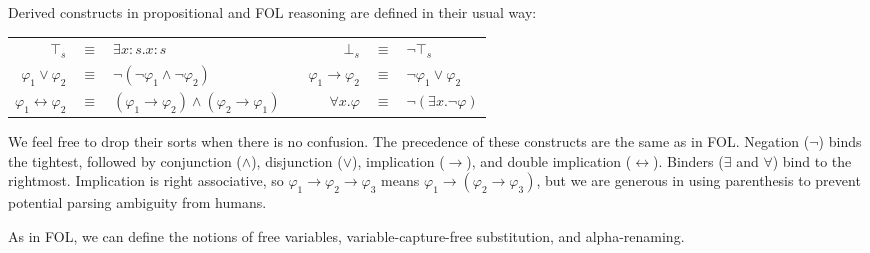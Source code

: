 \documentclass[acmsmall]{acmart}
\theoremstyle{acmdefinition}
\newcommand{\imp}{\to}
\newcommand{\dimp}{\leftrightarrow}
\newcommand{\cln}{{:}}
\begin{document}
Derived constructs in propositional and FOL reasoning
are defined in their usual way:
\begin{center}
\begin{tabular}{rclp{1cm}rcl}
$\top_s$ & $\equiv$ & $\exists x \cln s . x \cln s$
&&
$\bot_s$ & $\equiv$ & $\neg \top_s$
\\
$\varphi_1 \vee \varphi_2$ & $\equiv$ & 
$\neg (\neg \varphi_1 \wedge \neg \varphi_2)$
&&
$\varphi_1 \imp \varphi_2$ & $\equiv$ &
$\neg \varphi_1 \vee \varphi_2$
\\
$\varphi_1 \dimp \varphi_2$ & $\equiv$ &
$(\varphi_1 \imp \varphi_2) \wedge (\varphi_2 \imp \varphi_1)$
&&
$\forall x . \varphi$ & $\equiv$ &
$\neg (\exists x . \neg \varphi)$
\end{tabular}
\end{center}
We feel free to drop their sorts when there is no confusion.
The precedence of these constructs are the same as in FOL.
Negation ($\neg$) binds the tightest, followed by
conjunction ($\wedge$),
disjunction ($\vee$),
implication ($\imp$),
and double implication ($\dimp$).
Binders ($\exists$ and $\forall$) bind to the rightmost.
Implication is right associative, so
$\varphi_1 \imp \varphi_2 \imp \varphi_3$
means
$\varphi_1 \imp (\varphi_2 \imp \varphi_3)$,
but we are generous in using parenthesis 
to prevent potential parsing ambiguity from humans.

As in FOL, we can define the notions of free variables,
variable-capture-free substitution,
and alpha-renaming.
\end{document}
